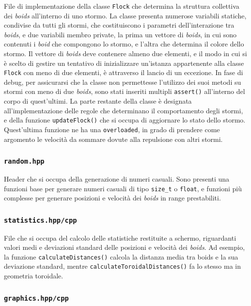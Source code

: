 \documentclass[10pt,a4paper]{article}
\begin{document}
File di implementazione della classe \texttt{Flock} che determina la struttura collettiva dei \textit{boids} all'interno di uno stormo. La classe presenta numerose variabili statiche, condivise da tutti gli stormi, che costituiscono i parametri dell'interazione tra \textit{boids}, e due variabili membro private, la prima un vettore di \textit{boids}, in cui sono contenuti i \textit{boid} che compongono lo stormo, e l'altra che determina il colore dello stormo. Il vettore di \textit{boids} deve contenere almeno due elementi, e il modo in cui si è scelto di gestire un tentativo di inizializzare un'istanza appartenente alla classe \texttt{Flock} con meno di due elementi, è attraverso il lancio di un eccezione. In fase di debug, per assicurarsi che la classe non permettesse l'utilizzo dei suoi metodi su stormi con meno di due \textit{boids}, sono stati inseriti multipli \texttt{assert()} all'interno del corpo di quest'ultimi. La parte restante della classe è designata all'implementazione delle regole che determinano il comportamento degli stormi, e della funzione \texttt{updateFlock()} che si occupa di aggiornare lo stato dello stormo. Quest'ultima funzione ne ha una \texttt{overloaded}, in grado di prendere come argomento le velocità da sommare dovute alla repulsione con altri stormi.

\subsubsection{\texttt{random.hpp}}

Header che si occupa della generazione di numeri casuali. Sono presenti una funzioni base per generare numeri casuali di tipo \texttt{size\_t} o \texttt{float}, e funzioni più complesse per generare posizioni e velocità dei \textit{boids} in range prestabiliti.

\subsubsection{\texttt{statistics.hpp/cpp}}

File che si occupa del calcolo delle statistiche restituite a schermo, riguardanti valori medi e deviazioni standard delle posizioni e velocità dei \textit{boids}. Ad esempio, la funzione \texttt{calculateDistances()} calcola la distanza media tra boids e la sua deviazione standard, mentre \texttt{calculateToroidalDistances()} fa lo stesso ma in geometria toroidale.

\subsubsection{\texttt{graphics.hpp/cpp}}
\end{document}
